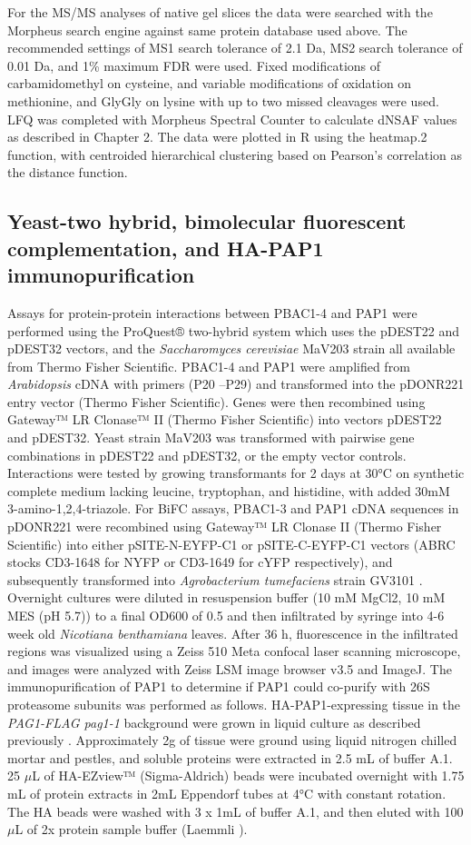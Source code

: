 For the MS/MS analyses of native gel slices the data were searched with the Morpheus search engine \citep{wenger13} against same protein database used above. The recommended settings of MS1 search tolerance of 2.1 Da, MS2 search tolerance of 0.01 Da, and 1\% maximum FDR were used.  Fixed modifications of carbamidomethyl on cysteine, and variable modifications of oxidation on methionine, and GlyGly on lysine with up to two missed cleavages were used. LFQ was completed with Morpheus Spectral Counter \citep{gemperline16} to calculate dNSAF values as described in Chapter 2. The data were plotted in R using the heatmap.2 function, with centroided hierarchical clustering based on Pearson’s correlation as the distance function.
\subsection{Yeast-two hybrid, bimolecular fluorescent complementation, and HA-PAP1 immunopurification}
	Assays for protein-protein interactions between PBAC1-4 and PAP1 were performed using the ProQuest® two-hybrid system which uses the pDEST22 and pDEST32 vectors, and the \textit{Saccharomyces cerevisiae} MaV203 strain \citep{vidal96} all available from Thermo Fisher Scientific. PBAC1-4 and PAP1 were amplified from \textit{Arabidopsis} cDNA with primers (P20 –P29) and transformed into the pDONR221 entry vector (Thermo Fisher Scientific). Genes were then recombined using Gateway™ LR Clonase™ II (Thermo Fisher Scientific) into vectors pDEST22 and pDEST32. Yeast strain MaV203 was transformed with pairwise gene combinations in pDEST22 and pDEST32, or the empty vector controls. Interactions were tested by growing transformants for 2 days at 30°C on synthetic complete medium lacking leucine, tryptophan, and histidine, with added 30mM 3-amino-1,2,4-triazole.
	For BiFC assays, PBAC1-3 and PAP1 cDNA sequences in pDONR221 were recombined using Gateway™  LR Clonase II (Thermo Fisher Scientific) into either pSITE-N-EYFP-C1 or pSITE-C-EYFP-C1 vectors \citep{martin09} (ABRC stocks CD3-1648 for NYFP or CD3-1649 for cYFP respectively), and subsequently transformed into \textit{Agrobacterium tumefaciens} strain GV3101 \citep{gelvin03}. Overnight cultures were diluted in resuspension buffer (10 mM MgCl2, 10 mM MES (pH 5.7)) to a final OD600 of 0.5 and then infiltrated by syringe into 4-6 week old \textit{Nicotiana benthamiana} leaves. After 36 h, fluorescence in the infiltrated regions was visualized using a Zeiss 510 Meta confocal laser scanning microscope, and images were analyzed with Zeiss LSM image browser v3.5 and ImageJ.
	The immunopurification of PAP1 to determine if PAP1 could co-purify with 26S proteasome subunits was performed as follows. HA-PAP1-expressing tissue in the \textit{PAG1-FLAG pag1-1} background were grown in liquid culture as described previously \citep{book10}. Approximately 2g of tissue were ground using liquid nitrogen chilled mortar and pestles, and soluble proteins were extracted in 2.5 mL of buffer A.1. 25 $\mu$L of HA-EZview™ (Sigma-Aldrich) beads were incubated overnight with 1.75 mL of protein extracts in 2mL Eppendorf tubes at 4°C with constant rotation. The HA beads were washed with 3 x 1mL of buffer A.1, and then eluted with 100$\mu$L of 2x protein sample buffer (Laemmli \citep{laemmli70}).  

